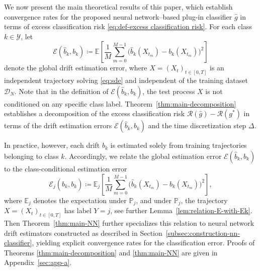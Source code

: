 \documentclass{article}
\theoremstyle{plain}
\theoremstyle{definition}
\theoremstyle{remark}
\newcommand{\PP}{\mathbb{P}}
\newcommand{\EE}{\mathbb{E}}
\begin{document}
We now present the main theoretical results of this paper, which establish convergence rates for the proposed neural network–based plug-in classifier \( \widehat g \) in terms of excess classification risk \eqref{eq:def-excess classification risk}.
For each class \(k\in\mathcal Y\), let
\begin{equation}\label{eq:def-estimation-error-all}
\mathcal{E}(\widehat b_k, b_k)
\coloneqq
\EE \!\left[
\frac{1}{M}\sum_{m=0}^{M-1}
\Big(\widehat b_k(X_{t_m})-b_k(X_{t_m})\Big)^2
\right]
\end{equation}
denote the global drift estimation error, where \(X=(X_t)_{t\in[0,T]}\) is an independent trajectory solving \eqref{eq:sde} and independent of the training dataset \(\mathcal D_N\). Note that in the definition of \(\mathcal{E}(\widehat b_k,b_k)\), the test process \(X\) is not conditioned on any specific class label. %
Theorem~\ref{thm:main-decomposition} establishes a decomposition of the excess classification risk
\(\mathcal R(\widehat g)-\mathcal R(g^*)\) in terms of the drift estimation errors \(\mathcal{E}(\widehat b_k,b_k)\) and the time discretization step \(\Delta\).

In practice, however, each drift \(b_k\) is estimated solely from training trajectories belonging to class \(k\).
Accordingly, we relate the global estimation error \(\mathcal{E}(\widehat b_k,b_k)\) to the class-conditional estimation error
\begin{equation}\label{eq:def-estimation-error-class-k}
\!\!\mathcal{E}_j(\widehat b_k,b_k)
\coloneqq
\EE_j \!\left[
\frac{1}{M}\!\sum_{m=0}^{M-1}\!
\Big(\widehat b_k(X_{t_m})-b_k(X_{t_m})\Big)^2
\right],\!
\end{equation}
where $\EE_j$ denotes the expectation under $\PP_j$, and under $\PP_j$, the trajectory \(X=(X_t)_{t\in[0,T]}\) has label \(Y=j\), see further Lemma~\ref{lem:relation-E-with-Ek}.
Then Theorem~\ref{thm:main-NN} further specializes this relation to neural network drift estimators constructed as described in Section~\ref{subsec:construction-nn-classifier}, yielding explicit convergence rates for the classification error. Proofs of Theorems \ref{thm:main-decomposition} and \ref{thm:main-NN} are given in Appendix~\ref{sec:app-a}.


\end{document}
